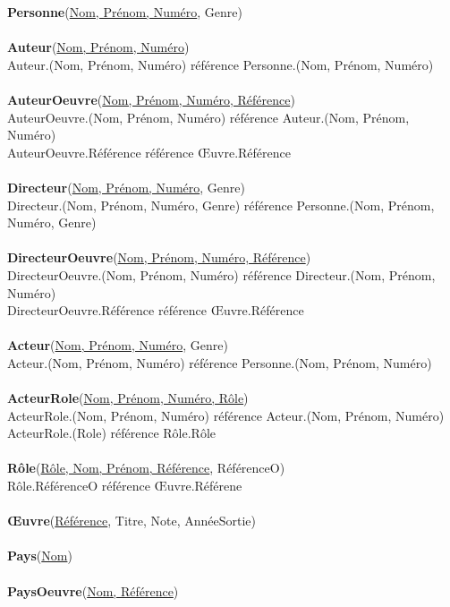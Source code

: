 \documentclass[10pt,a4paper]{article}
\begin{document}
\textbf{Personne}(\underline{Nom, Prénom, Numéro}, Genre)
\\
\\
\textbf{Auteur}(\underline{Nom, Prénom, Numéro})
\\
		Auteur.(Nom, Prénom, Numéro) référence Personne.(Nom, Prénom, Numéro)
\\ \\
\textbf{AuteurOeuvre}(\underline{Nom, Prénom, Numéro, Référence})
\\
		AuteurOeuvre.(Nom, Prénom, Numéro) référence Auteur.(Nom, Prénom, Numéro)
\\
		AuteurOeuvre.Référence référence Œuvre.Référence
\\
\\
\textbf{Directeur}(\underline{Nom, Prénom, Numéro}, Genre)
\\
		Directeur.(Nom, Prénom, Numéro, Genre) référence Personne.(Nom, Prénom, Numéro, Genre)
\\ \\
\textbf{DirecteurOeuvre}(\underline{Nom, Prénom, Numéro, Référence})
\\
		DirecteurOeuvre.(Nom, Prénom, Numéro) référence Directeur.(Nom, Prénom, Numéro)
        \\
		DirecteurOeuvre.Référence référence Œuvre.Référence
\\
\\
\textbf{Acteur}(\underline{Nom, Prénom, Numéro}, Genre)
\\
		Acteur.(Nom, Prénom, Numéro) référence Personne.(Nom, Prénom, Numéro)
\\
\\
\textbf{ActeurRole}(\underline{Nom, Prénom, Numéro, Rôle})
\\
		ActeurRole.(Nom, Prénom, Numéro) référence Acteur.(Nom, Prénom, Numéro)
    \\
		ActeurRole.(Role) référence Rôle.Rôle
\\
\\
\textbf{Rôle}(\underline{Rôle, Nom, Prénom, Référence}, RéférenceO)
\\
		Rôle.RéférenceO référence Œuvre.Référene
\\
\\
\textbf{Œuvre}(\underline{Référence}, Titre, Note, AnnéeSortie)
\\
\\
\textbf{Pays}(\underline{Nom})
\\
\\
\textbf{PaysOeuvre}(\underline{Nom, Référence})
\\
\end{document}
